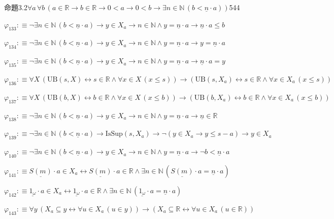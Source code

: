 \begin{fullproof}{命題3.2}{$\forall a\,\forall b\,(a \in \mathbb{R} \to b \in \mathbb{R} \to 0 < a \to 0 < b \to \exists n \in \mathbb{N}\,(b < \underline{n} \cdot a))$}{544}
\begin{abbrevlist}
\item $\varphi_{133} :\equiv \neg \exists n \in \mathbb{N}\,(b < \underline{n} \cdot a) \to y \in X_{a} \to n \in \mathbb{N} \land y = \underline{n} \cdot a \to \underline{n} \cdot a \leq b$
\item $\varphi_{134} :\equiv \neg \exists n \in \mathbb{N}\,(b < \underline{n} \cdot a) \to y \in X_{a} \to n \in \mathbb{N} \land y = \underline{n} \cdot a \to y = \underline{n} \cdot a$
\item $\varphi_{135} :\equiv \neg \exists n \in \mathbb{N}\,(b < \underline{n} \cdot a) \to y \in X_{a} \to n \in \mathbb{N} \land y = \underline{n} \cdot a \to \underline{n} \cdot a = y$
\item $\varphi_{136} :\equiv \forall X\,(\mathrm{UB}(s,X) \leftrightarrow s \in \mathbb{R} \land \forall x \in X\,(x \leq s)) \to (\mathrm{UB}(s,X_{a}) \leftrightarrow s \in \mathbb{R} \land \forall x \in X_{a}\,(x \leq s))$
\item $\varphi_{137} :\equiv \forall X\,(\mathrm{UB}(b,X) \leftrightarrow b \in \mathbb{R} \land \forall x \in X\,(x \leq b)) \to (\mathrm{UB}(b,X_{a}) \leftrightarrow b \in \mathbb{R} \land \forall x \in X_{a}\,(x \leq b))$
\item $\varphi_{138} :\equiv \neg \exists n \in \mathbb{N}\,(b < \underline{n} \cdot a) \to y \in X_{a} \to n \in \mathbb{N} \land y = \underline{n} \cdot a \to \underline{n} \in \mathbb{R}$
\item $\varphi_{139} :\equiv \neg \exists n \in \mathbb{N}\,(b < \underline{n} \cdot a) \to \mathrm{IsSup}(s,X_{a}) \to \neg (y \in X_{a} \to y \leq s - a) \to y \in X_{a}$
\item $\varphi_{140} :\equiv \neg \exists n \in \mathbb{N}\,(b < \underline{n} \cdot a) \to y \in X_{a} \to n \in \mathbb{N} \land y = \underline{n} \cdot a \to \neg b < \underline{n} \cdot a$
\item $\varphi_{141} :\equiv \underline{S(m)} \cdot a \in X_{a} \leftrightarrow \underline{S(m)} \cdot a \in \mathbb{R} \land \exists n \in \mathbb{N}\,(\underline{S(m)} \cdot a = \underline{n} \cdot a)$
\item $\varphi_{142} :\equiv \underline{1_{\omega}} \cdot a \in X_{a} \leftrightarrow \underline{1_{\omega}} \cdot a \in \mathbb{R} \land \exists n \in \mathbb{N}\,(\underline{1_{\omega}} \cdot a = \underline{n} \cdot a)$
\item $\varphi_{143} :\equiv \forall y\,(X_{a} \subseteq y \leftrightarrow \forall u \in X_{a}\,(u \in y)) \to (X_{a} \subseteq \mathbb{R} \leftrightarrow \forall u \in X_{a}\,(u \in \mathbb{R}))$

\end{abbrevlist}
\end{fullproof}
